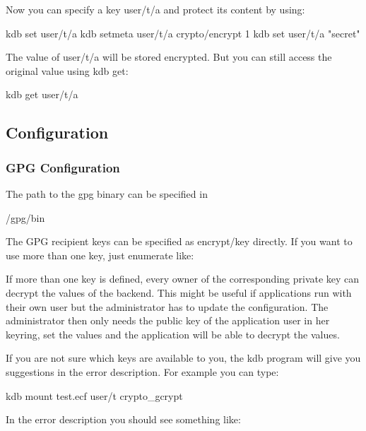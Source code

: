 Now you can specify a key {\ttfamily user/t/a} and protect its content by using\+: \begin{DoxyVerb}kdb set user/t/a
kdb setmeta user/t/a crypto/encrypt 1
kdb set user/t/a "secret"
\end{DoxyVerb}


The value of {\ttfamily user/t/a} will be stored encrypted. But you can still access the original value using {\ttfamily kdb get}\+: \begin{DoxyVerb}kdb get user/t/a
\end{DoxyVerb}


\subsection*{Configuration}

\subsubsection*{G\+PG Configuration}

The path to the gpg binary can be specified in \begin{DoxyVerb}/gpg/bin
\end{DoxyVerb}


The G\+PG recipient keys can be specified as {\ttfamily encrypt/key} directly. If you want to use more than one key, just enumerate like\+: 


If more than one key is defined, every owner of the corresponding private key can decrypt the values of the backend. This might be useful if applications run with their own user but the administrator has to update the configuration. The administrator then only needs the public key of the application user in her keyring, set the values and the application will be able to decrypt the values.

If you are not sure which keys are available to you, the {\ttfamily kdb} program will give you suggestions in the error description. For example you can type\+: \begin{DoxyVerb}kdb mount test.ecf user/t crypto_gcrypt
\end{DoxyVerb}


In the error description you should see something like\+: 


